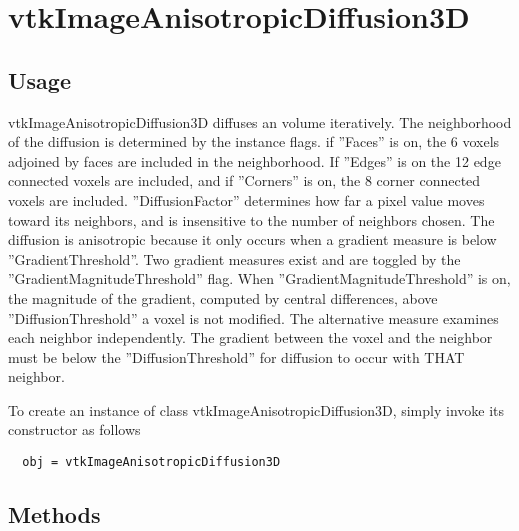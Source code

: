 \section{vtkImageAnisotropicDiffusion3D}

\subsection{Usage}

 vtkImageAnisotropicDiffusion3D  diffuses an volume iteratively.
 The neighborhood of the diffusion is determined by the instance
 flags. if ''Faces'' is on, the 6 voxels adjoined by faces are included
 in the neighborhood.  If ''Edges'' is on the 12 edge connected voxels
 are included, and if ''Corners'' is on, the 8 corner connected voxels
 are included.  ''DiffusionFactor'' determines how far a pixel value
 moves toward its neighbors, and is insensitive to the number of 
 neighbors chosen.  The diffusion is anisotropic because it only occurs
 when a gradient measure is below ''GradientThreshold''.  Two gradient measures
 exist and are toggled by the ''GradientMagnitudeThreshold'' flag.
 When ''GradientMagnitudeThreshold'' is on, the magnitude of the gradient,
 computed by central differences, above ''DiffusionThreshold''
 a voxel is not modified.  The alternative measure examines each
 neighbor independently.  The gradient between the voxel and the neighbor
 must be below the ''DiffusionThreshold'' for diffusion to occur with
 THAT neighbor.

To create an instance of class vtkImageAnisotropicDiffusion3D, simply
invoke its constructor as follows
\begin{verbatim}
  obj = vtkImageAnisotropicDiffusion3D
\end{verbatim}
\subsection{Methods}

